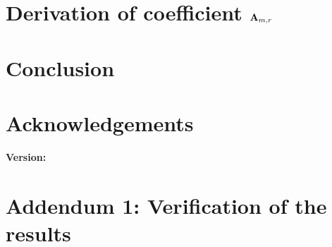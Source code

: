 \documentclass[12pt,letterpaper,oneside,reqno]{amsart}
\newcommand \coeffA [3][A] {{\mathbf{#1}} \sb{#2,#3}}
\numberwithin{equation}{section}
\begin{document}
    \section{Derivation of coefficient \texorpdfstring{$\coeffA{m}{r}$}{A[m,r]}}
    \label{sec:derivation-of-coefficients-a}
    


    \section{Conclusion}
    \label{sec:conclusion}
    


    \section{Acknowledgements}
    \label{sec:acknowledgements}
    


    
    
    \noindent \textbf{Version:} 

    \clearpage


    \section{Addendum 1: Verification of the results}
    \label{sec:verification-of-the-results-and-examples}
    
\end{document}
